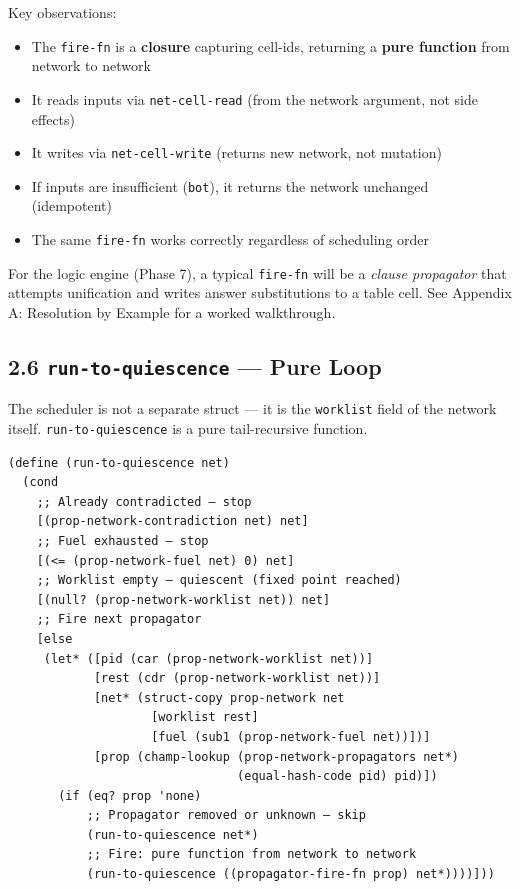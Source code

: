 \documentclass[11pt]{article}
\begin{document}
Key observations:
\begin{itemize}
\item The \texttt{fire-fn} is a \textbf{closure} capturing cell-ids, returning a \textbf{pure function}
from network to network
\item It reads inputs via \texttt{net-cell-read} (from the network argument, not side effects)
\item It writes via \texttt{net-cell-write} (returns new network, not mutation)
\item If inputs are insufficient (\texttt{bot}), it returns the network unchanged (idempotent)
\item The same \texttt{fire-fn} works correctly regardless of scheduling order
\end{itemize}

For the logic engine (Phase 7), a typical \texttt{fire-fn} will be a \emph{clause propagator}
that attempts unification and writes answer substitutions to a table cell. See
Appendix A: Resolution by Example for a worked walkthrough.
\subsection{2.6 \texttt{run-to-quiescence} — Pure Loop}
\label{sec:org6e46604}

The scheduler is not a separate struct — it is the \texttt{worklist} field of the
network itself. \texttt{run-to-quiescence} is a pure tail-recursive function.

\begin{verbatim}
(define (run-to-quiescence net)
  (cond
    ;; Already contradicted — stop
    [(prop-network-contradiction net) net]
    ;; Fuel exhausted — stop
    [(<= (prop-network-fuel net) 0) net]
    ;; Worklist empty — quiescent (fixed point reached)
    [(null? (prop-network-worklist net)) net]
    ;; Fire next propagator
    [else
     (let* ([pid (car (prop-network-worklist net))]
            [rest (cdr (prop-network-worklist net))]
            [net* (struct-copy prop-network net
                    [worklist rest]
                    [fuel (sub1 (prop-network-fuel net))])]
            [prop (champ-lookup (prop-network-propagators net*)
                                (equal-hash-code pid) pid)])
       (if (eq? prop 'none)
           ;; Propagator removed or unknown — skip
           (run-to-quiescence net*)
           ;; Fire: pure function from network to network
           (run-to-quiescence ((propagator-fire-fn prop) net*))))]))
\end{verbatim}
\end{document}
